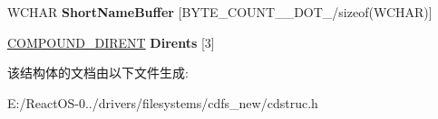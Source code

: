 \begin{DoxyCompactItemize}
\item 
\mbox{\label{struct___f_i_l_e___e_n_u_m___c_o_n_t_e_x_t_aa29282de6a21bdec29202cd41b74e2b1}} 
W\+C\+H\+AR {\bfseries Short\+Name\+Buffer} \mbox{[}B\+Y\+T\+E\+\_\+\+C\+O\+U\+N\+T\+\_\+\_\+\+D\+O\+T\+\_/sizeof(W\+C\+H\+AR)\mbox{]}
\item 
\mbox{\label{struct___f_i_l_e___e_n_u_m___c_o_n_t_e_x_t_a410d30c31a7fac0034aa5f0a9279a849}} 
\hyperlink{struct___c_o_m_p_o_u_n_d___d_i_r_e_n_t}{C\+O\+M\+P\+O\+U\+N\+D\+\_\+\+D\+I\+R\+E\+NT} {\bfseries Dirents} \mbox{[}3\mbox{]}
\end{DoxyCompactItemize}


该结构体的文档由以下文件生成\+:\begin{DoxyCompactItemize}
\item 
E\+:/\+React\+O\+S-\/0../drivers/filesystems/cdfs\+\_\+new/cdstruc.\+h\end{DoxyCompactItemize}
